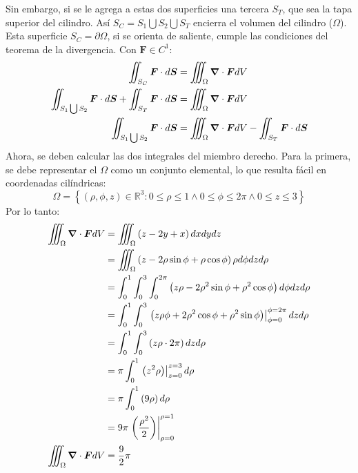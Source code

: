 \begin{solution}
    Sin embargo, si se le agrega a estas dos superficies una tercera $S_T$, que sea la tapa superior del cilindro.
    Así $S_C = S_1 \bigcup S_2 \bigcup S_T$ encierra el volumen del cilindro ($\Omega$). Esta superficie $S_C = \partial\Omega$, si se
    orienta de saliente, cumple las condiciones del teorema de la divergencia. Con $\boldsymbol{F} \in C^1$:
    \begin{align*}
        \iint_{S_C} \boldsymbol{F} \cdot d\boldsymbol{S} &= \iiint_{\Omega} \grad \cdot \boldsymbol{F} dV\\
        \iint_{S_1 \bigcup S_2} \boldsymbol{F} \cdot d\boldsymbol{S} + \iint_{S_T} \boldsymbol{F} \cdot d\boldsymbol{S}&= \iiint_{\Omega} \grad \cdot \boldsymbol{F} dV\\
        \iint_{S_1 \bigcup S_2} \boldsymbol{F} \cdot d\boldsymbol{S} &= \iiint_{\Omega} \grad \cdot \boldsymbol{F} dV - \iint_{S_T} \boldsymbol{F} \cdot d\boldsymbol{S}
    \end{align*}
    Ahora, se deben calcular las dos integrales del miembro derecho. Para la primera, se debe representar el $\Omega$ 
    como un conjunto elemental, lo que resulta fácil en coordenadas cilíndricas:
    \begin{equation*}
    \Omega = \left\{(\rho,\phi,z) \in \mathbb{R}^3: 0\leq\rho\leq1 \land 0\leq\phi\leq2\pi \land 0\leq z \leq 3 \right\}
    \end{equation*}
    Por lo tanto:
    \begin{align*}
        \iiint_{\Omega} \grad \cdot \boldsymbol{F} dV &= \iiint_{\Omega} \left(z-2y+x\right)dxdydz\\
        &=\iiint_{\Omega} \left(z-2\rho\sin{\phi}+\rho\cos{\phi}\right)\rho d\phi dz d\rho\\
        &=\int_{0}^{1} \int_{0}^{3} \int_{0}^{2\pi} \left(z\rho-2\rho^2\sin{\phi}+\rho^2\cos{\phi}\right) d\phi dz d\rho\\
        &= \int_{0}^{1} \int_{0}^{3}  \left.\left(z\rho\phi+2\rho^2\cos{\phi}+\rho^2\sin{\phi}\right)\right|_{\phi=0}^{\phi=2\pi} dz d\rho\\
        &= \int_{0}^{1} \int_{0}^{3}  \left(z\rho\cdot2\pi\right) dz d\rho\\
        &= \pi\int_{0}^{1}  \left.\left(z^2\rho\right)\right|_{z=0}^{z=3} d\rho\\
        &= \pi\int_{0}^{1}  \left(9\rho\right) d\rho\\
        &= 9\pi \left.\left(\frac{\rho^2}{2}\right)\right|_{\rho=0}^{\rho=1}\\
        \iiint_{\Omega} \grad \cdot \boldsymbol{F} dV&= \frac{9}{2}\pi

\end{align*}
\end{solution}
